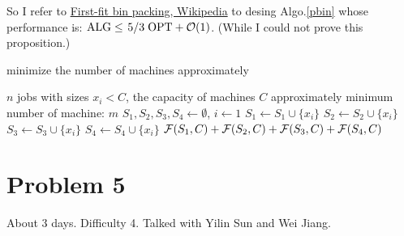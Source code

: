 \documentclass{article}
\begin{document}
So I refer to \href{https://en.wikipedia.org/wiki/First-fit_bin_packing#cite_note-Ullman713-1}{First-fit bin packing, Wikipedia} to desing Algo.\ref{pbin} whose performance is: $\rm{ALG}\le \flatfrac{5}{3}\rm{OPT}+\+O(1)$. (While I could not prove this proposition.)
\\[5pt]
\begin{algorithm}[htbp]
	\caption{minimize the number of machines approximately}
	\label{pbin}
	\begin{algorithmic}[1]
		\renewcommand{\algorithmicrequire}{\textbf{Input:}}
		\renewcommand{\algorithmicensure}{\textbf{Output:}}
		\renewcommand{\algorithmiccomment}[1]{\hfill\textit{\textcolor{blue}{\##1}}}
		\REQUIRE $n$ jobs with sizes $x_i<C$, the capacity of machines  $C$
		\ENSURE  approximately minimum number of machine: $m$
		\STATE $S_1,S_2,S_3,S_4\gets\emptyset$,  $i\gets 1$
		\STATE $S_1\gets S_1\cup\{x_i\}$
		\ENDIF
		\STATE $S_2\gets S_2\cup\{x_i\}$
		\ENDIF
		\STATE $S_3\gets S_3\cup\{x_i\}$
		\ENDIF
		\STATE $S_4\gets S_4\cup\{x_i\}$
		\ENDIF
		\ENDWHILE
		\RETURN $\mathcal{F}(S_1,C)+\mathcal{F}(S_2,C)+\mathcal{F}(S_3,C)+\mathcal{F}(S_4,C)$
	\end{algorithmic} 
\end{algorithm}

\section*{Problem 5}
About 3 days. Difficulty 4. Talked with Yilin Sun and Wei Jiang.
\end{document}
